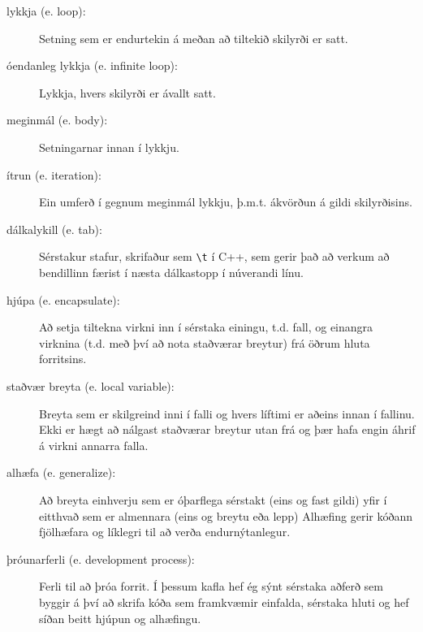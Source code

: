 \begin{description}

\item[lykkja (e. loop):]  Setning sem er endurtekin á meðan að tiltekið skilyrði er satt.

\item[óendanleg lykkja (e. infinite loop):]  Lykkja, hvers skilyrði er ávallt satt.

\item[meginmál (e. body):]  Setningarnar innan í lykkju.

\item[ítrun (e. iteration):]  Ein umferð í gegnum meginmál lykkju, þ.m.t. ákvörðun á gildi skilyrðisins.

\item[dálkalykill (e. tab):] Sérstakur stafur, skrifaður sem \verb+\t+ í C++, sem gerir það að verkum að 
bendillinn færist í næsta dálkastopp í núverandi línu.

\item[hjúpa (e. encapsulate):]  Að setja tiltekna virkni inn í sérstaka einingu, t.d. fall, og einangra virknina (t.d. með því að nota staðværar breytur) frá öðrum hluta forritsins.

\item[staðvær breyta (e. local variable):]  Breyta sem er skilgreind inni í falli og hvers líftimi er aðeins innan í fallinu.
Ekki er hægt að nálgast staðværar breytur utan frá og þær hafa engin áhrif á virkni annarra falla.

\item[alhæfa (e. generalize):]  Að breyta einhverju sem er óþarflega sérstakt (eins og fast gildi) yfir í eitthvað sem er almennara (eins og breytu eða lepp)
Alhæfing gerir kóðann fjölhæfara og líklegri til að verða endurnýtanlegur.

\item[þróunarferli (e. development process):]  Ferli til að þróa forrit.
Í þessum kafla hef ég sýnt sérstaka aðferð sem byggir á því að skrifa kóða sem framkvæmir einfalda, sérstaka hluti og hef síðan beitt hjúpun og alhæfingu.


\end{description}

